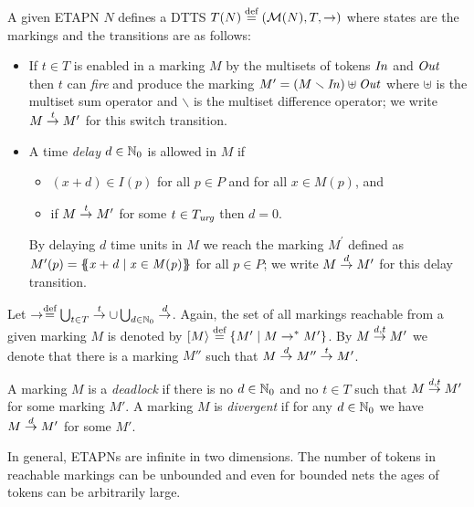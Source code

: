 A given ETAPN $N$ %
defines a DTTS $T(N)\stackrel{\textrm{def}}{=} (\mathcal{M}(N),T,\rightarrow)$
where states are the markings and the transitions are as follows: 
\begin{itemize}
\item If $t\in T$ is enabled in a marking $M$ by the  multisets of
tokens $\mathit{In}$ and $\mathit{Out}$ then $t$ can \emph{fire} and produce 
the marking $M^{\prime} = (M \smallsetminus \mathit{In}) \uplus \mathit{Out}$ 
where  $\uplus$ is the multiset sum operator and $\smallsetminus$ is the multiset 
difference operator; we write $M \stackrel{t}{\rightarrow} M^{\prime}$ for this 
switch transition.
\item A time \emph{delay} $d \in \mathbb{N}_{0}$ is allowed in $M$ if
\begin{itemize}
\item $(x+d) \in I(p)$ for all $p \in P$ and for all $x \in M(p)$, and
\item if $M \stackrel{t}{\rightarrow} M'$ for some $t \in T_{\mathit{urg}}$ then $d=0$.
\end{itemize}
By delaying $d$ time units in $M$ we reach the marking $M^{\prime}$ defined as
$M^{\prime}(p) = \mathit{\{\!\!\{x+d \mid x \in M(p)\}\!\!\}}$ for all $p \in P$; 
we write $M \stackrel{d}{\rightarrow} M^{\prime}$ for this delay transition.
\end{itemize}


\noindent Let 
$\stackrel{}{\rightarrow} \stackrel{\textrm{def}}{=} \bigcup_{t \in T} \stackrel{t}{\rightarrow} \cup \bigcup_{d \in \mathbb{N}_{0}} \stackrel{d}{\rightarrow}$.
Again, the set of all markings reachable %
from a given marking $M$ is denoted by 
$[M\rangle \stackrel{\textrm{def}}{=} \{ M' \mid M \stackrel{}{\rightarrow}^* M' \}$.
By $M \stackrel{d,t}{\rightarrow} M'$ we denote that there is a marking $M''$
such that $M \stackrel{d}{\rightarrow} M'' \stackrel{t}{\rightarrow} M'$.

A marking $M$ is a \emph{deadlock} if there is no $d \in \mathbb{N}_{0}$ and
no $t \in T$ such that $M \stackrel{d,t}{\rightarrow} M'$ 
for some marking $M'$.
A marking $M$ is \emph{divergent} if for any $d \in \mathbb{N}_{0}$
we have $M \stackrel{d}{\rightarrow} M'$ for some $M'$.



In general, ETAPNs are infinite in two dimensions. The number of tokens
in reachable markings can be unbounded and even for bounded nets
the ages of tokens can be arbitrarily large. 

